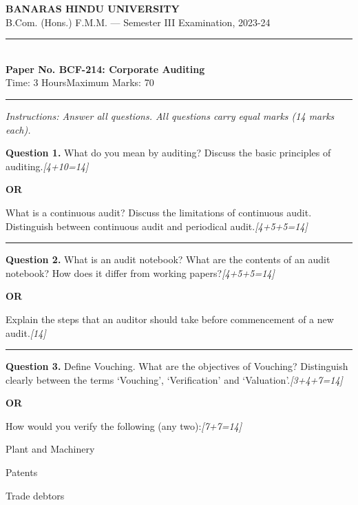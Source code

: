 \documentclass[11pt,a4paper]{article}
\newcommand{\pts}[1]{\hfill   \textit{[#1]}}
\begin{document}
\begin{center}
  {\large\bfseries BANARAS HINDU UNIVERSITY}\\[2pt]
  {\normalsize B.Com. (Hons.) F.M.M. --- Semester III Examination, 2023-24}\\[6pt]
  \rule{0.8\linewidth}{0.5pt}\\[6pt]
  {\large\bfseries Paper No. BCF-214: Corporate Auditing}\\[4pt]
  {\normalsize Time: 3 Hours\hfill Maximum Marks: 70}
\end{center}

\rule{\linewidth}{0.4pt}

\smallskip



\noindent   \textit{Instructions: Answer all questions. All questions carry equal marks (14 marks each).}

\bigskip




\noindent   \textbf{Question 1.}
What do you mean by auditing? Discuss the basic principles of auditing.\pts{4+10=14}

\centerline{   \textbf{OR}}

What is a continuous audit? Discuss the limitations of continuous audit. Distinguish between continuous audit and periodical audit.\pts{4+5+5=14}

\medskip\rule{\linewidth}{0.2pt}




\noindent   \textbf{Question 2.}
What is an audit notebook? What are the contents of an audit notebook? How does it differ from working papers?\pts{4+5+5=14}

\centerline{   \textbf{OR}}

Explain the steps that an auditor should take before commencement of a new audit.\pts{14}

\medskip\rule{\linewidth}{0.2pt}




\noindent   \textbf{Question 3.}
Define Vouching. What are the objectives of Vouching? Distinguish clearly between the terms `Vouching', `Verification' and `Valuation'.\pts{3+4+7=14}

\centerline{   \textbf{OR}}

How would you verify the following (any two):\pts{7+7=14}

\begin{parts}
  \item Plant and Machinery
  \item Patents
  \item Trade debtors
\end{parts}
\end{document}
